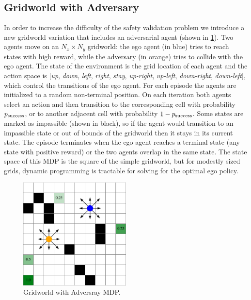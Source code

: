 \subsection{Gridworld with Adversary}
In order to increase the difficulty of the safety validation problem we introduce a new gridworld variation that includes an adversarial agent (shown in \cref{fig:gridworld_with_adversary}). Two agents move on an $N_x \times N_y$ gridworld: the ego agent (in blue) tries to reach states with high reward, while the adversary (in orange) tries to collide with the ego agent. The state of the environment is the grid location of each agent and the action space is [\emph{up}, \emph{down}, \emph{left}, \emph{right}, \emph{stay}, \emph{up-right}, \emph{up-left}, \emph{down-right}, \emph{down-left}], which control the transitions of the ego agent. For each episode the agents are initialized to a random non-terminal position. On each iteration both agents select an action and then transition to the corresponding cell with probability $p_{\rm success}$, or to another adjacent cell with probability $1-p_{\rm success}$. Some states are marked as impassible (shown in black), so if the agent would transition to an impassible state or out of bounds of the gridworld then it stays in its current state. The episode terminates when the ego agent reaches a terminal state (any state with positive reward) or the two agents overlap in the same state. The state space of this MDP is the square of the simple gridworld, but for modestly sized grids, dynamic programming is tractable for solving for the optimal ego policy. 

\begin{figure}
    \centering
    \includegraphics[width=0.5\textwidth]{figures/sample_systems/gridworld_with_adversary.pdf}
    \caption{Gridworld with Adversray MDP.}
    \label{fig:gridworld_with_adversary}
\end{figure}

